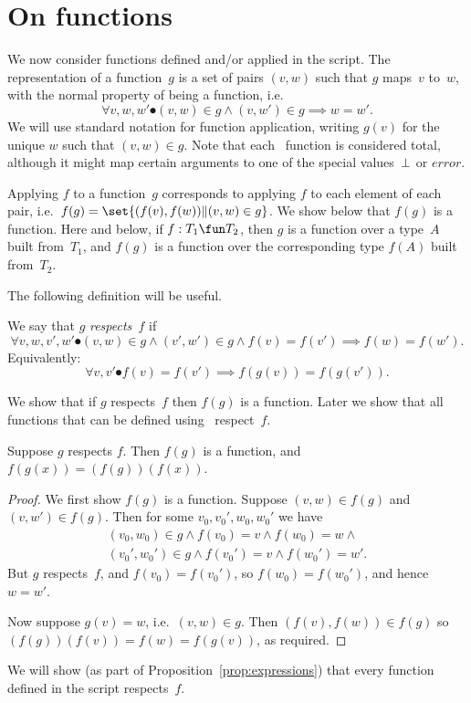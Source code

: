 \section{On functions}
\label{sec:functions}

We now consider functions defined and/or applied in the script.
The representation of a function~$g$ is a set of pairs $(v,w)$ such that $g$
maps~$v$ to~$w$, with the normal property of being a function, i.e.
\[
\forall v, w, w' \spot (v,w) \in g \land (v,w') \in g \implies w=w'.
\]
We will use standard notation for function application, writing $g(v)$ for the
unique $w$ such that $(v,w) \in g$.
%
Note that each \CSPm\ function is considered total, although it might map
certain arguments to one of the special values~$\perp$ or $error$. 

Applying $f$ to a function~$g$ corresponds to applying $f$ to each element of
each pair, i.e.~$f(g) = \set{(f(v), f(w)) \| (v,w) \in g}$.  We show below
that $f(g)$ is a function.  Here and below, if $f: T_1 \fun T_2$, then $g$ is
a function over a type~$A$ built from~$T_1$, and $f(g)$ is a function over the
corresponding type $f(A)$ built from~$T_2$.

The following definition will be useful.
%
\begin{definition}
We say that $g$ \emph{respects~$f$} if
\[
\forall v, w, v', w' \spot 
  (v,w) \in g \land (v',w') \in g \land f(v) = f(v') \implies f(w) = f(w'). 
\]
Equivalently:
\[
\forall v,  v' \spot f(v) = f(v') \implies f(g(v)) = f(g(v')). 
\]
\end{definition}

We show that if $g$ respects~$f$ then $f(g)$ is a function.  Later we show
that all functions that can be defined using \CSPm\ respect~$f$. 
%
\begin{lemma}
\label{lem:function-respects}
Suppose $g$ respects $f$.  Then $f(g)$ is a function, and $f(g(x)) =
(f(g))(f(x))$.
\end{lemma}
%
\begin{proof}
We first show $f(g)$ is a function.  Suppose $(v,w) \in f(g)$ and $(v,w') \in
f(g)$.  Then for some $v_0, v_0', w_0, w_0'$ we have
\[
\begin{align}
(v_0,w_0) \in g \land f(v_0) = v \land f(w_0) = w \land \\
(v_0',w_0') \in g \land f(v_0') = v \land f(w_0') = w'.
\end{align}
\]
But $g$ respects~$f$, and $f(v_0) = f(v_0')$, so $f(w_0) = f(w_0')$, and hence
$w = w'$.

Now suppose $g(v) = w$, i.e.~$(v,w) \in g$.  Then $(f(v),f(w)) \in f(g)$ so
$(f(g))(f(v)) = f(w) = f(g(v))$, as required.
\end{proof}

We will show (as part of Proposition~\ref{prop:expressions}) that every
function defined in the script respects~$f$. 
